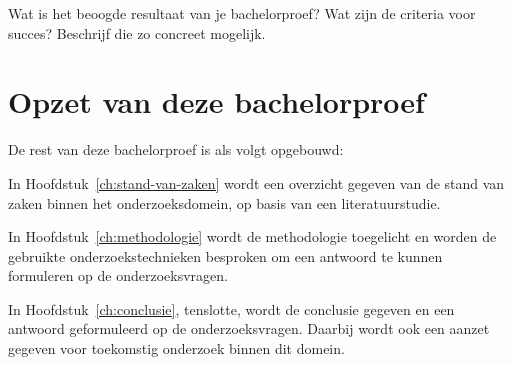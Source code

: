 Wat is het beoogde resultaat van je bachelorproef? Wat zijn de criteria voor succes? Beschrijf die zo concreet mogelijk.

\section{Opzet van deze bachelorproef}
\label{sec:opzet-bachelorproef}


De rest van deze bachelorproef is als volgt opgebouwd:

In Hoofdstuk~\ref{ch:stand-van-zaken} wordt een overzicht gegeven van de stand van zaken binnen het onderzoeksdomein, op basis van een literatuurstudie.

In Hoofdstuk~\ref{ch:methodologie} wordt de methodologie toegelicht en worden de gebruikte onderzoekstechnieken besproken om een antwoord te kunnen formuleren op de onderzoeksvragen.


In Hoofdstuk~\ref{ch:conclusie}, tenslotte, wordt de conclusie gegeven en een antwoord geformuleerd op de onderzoeksvragen. Daarbij wordt ook een aanzet gegeven voor toekomstig onderzoek binnen dit domein.

